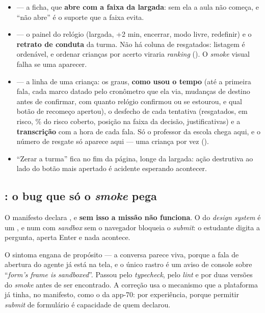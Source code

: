\begin{itemize}
  \item {} --- a ficha, que
    \textbf{abre com a faixa da largada}: sem ela a aula não começa, e
    \enquote{não abre} é o suporte que a faixa evita.
  \item {} --- o painel do relógio (largada,
    +2 min, encerrar, modo livre, redefinir) e o \textbf{retrato de conduta} da
    turma. Não há coluna de resgatados: listagem é ordenável, e ordenar crianças
    por acerto viraria \emph{ranking} (). O \emph{smoke} visual
    falha se uma aparecer.
  \item {} --- a linha de uma criança: os graus,
    \textbf{como usou o tempo} (até a primeira fala, cada marco datado pelo
    cronômetro que ela via, mudanças de destino antes de confirmar, com quanto
    relógio confirmou ou se estourou, e qual botão de recomeço apertou), o
    desfecho de cada tentativa (resgatados, em risco, \% do risco coberto,
    posição na faixa da decisão, justificativas) e a \textbf{transcrição} com a
    hora de cada fala. Só o professor da escola chega aqui, e o número de
    resgate só aparece aqui --- uma criança por vez ().
  \item \enquote{Zerar a turma} fica no fim da página, longe da largada: ação
    destrutiva ao lado do botão mais apertado é acidente esperando acontecer.
\end{itemize}

\subsection{: o bug que só o \emph{smoke} pega}

\begin{atencao}
O manifesto declara , e \textbf{sem isso a missão não
funciona}. O  do \emph{design system} é um , e num
 com \emph{sandbox} sem  o navegador bloqueia o
\emph{submit}: o estudante digita a pergunta, aperta Enter e nada acontece.
\end{atencao}

O sintoma engana de propósito --- a conversa parece viva, porque a fala de
abertura do agente já está na tela, e o único rastro é um aviso de console sobre
\enquote{\emph{form's frame is sandboxed}}. Passou pelo \emph{typecheck}, pelo
\emph{lint} e por duas versões do \emph{smoke} antes de ser encontrado. A correção
usa o mecanismo que a plataforma já tinha,  no manifesto, como o
 da app-70: por experiência, porque permitir \emph{submit} de
formulário é capacidade de quem declarou.

